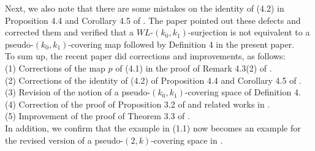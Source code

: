 \documentclass[J,12pt]{amsart}
\begin{document}
Next, we also note that there are some mistakes on the identity of (4.2) in Proposition 4.4 and Corollary 4.5 of \cite{H9}. 
The paper \cite{H10} pointed out these defects and corrected them and verified that a $WL$-$(k_0, k_1)$-surjection is not equivalent to a pseudo-$(k_0, k_1)$-covering map followed by Definition 4 in the present paper. \\

To sum up, the recent paper \cite{H10} did corrections and improvements, as follows:\\
(1) Corrections of the map $p$ of (4.1) in the proof of Remark 4.3(2) of \cite{H9}.\\
(2) Corrections of the identity of (4.2) of Proposition 4.4 and Corollary 4.5 of \cite{H9}.\\
(3) Revision of the notion of a pseudo-$(k_0, k_1)$-covering space of Definition 4.\\
(4) Correction of the proof of Proposition 3.2 of \cite{P1} and related works in \cite{P2}.\\
(5) Improvement of the proof of Theorem 3.3 of \cite{P2}. \\
In addition, we confirm that the example in (1.1) now becomes an example for the revised version of a pseudo-$(2, k)$-covering space in \cite{H10}.
\end{document}
